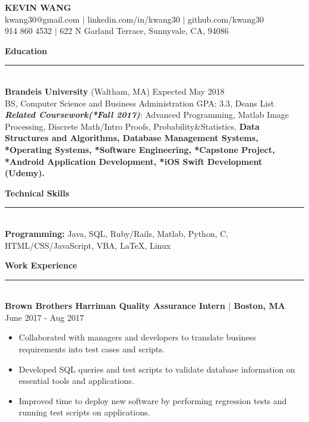 \documentclass{article}
\newcommand{\HRule}{\rule{\linewidth}{0.4mm}}
\begin{document}



\begin{center}
\textbf{{\LARGE {\Huge {KEVIN WANG}}}} \\ 
{\fontsize{11}{13.2} kwang30@gmail.com  $|$ linkedin.com/in/kwang30 $|$ github.com/kwang30 \\
914 860 4532 $|$ 622 N Garland Terrace, Sunnyvale, CA, 94086}\\[1ex]
\end{center}
\vspace{-2mm}
\normalsize

\noindent
\textbf{{\Large Education}}\\[-2mm]
\HRule\\
\textbf{Brandeis University} (Waltham, MA)
\hfill Expected May 2018 \\
\indent
BS, Computer Science and Business Administration
\hfill{GPA: 3.3, Deans List}\\
\textit{\textbf{Related Coursework(*Fall 2017)}}: Advanced Programming, Matlab Image Processing, Discrete Math/Intro Proofs, Probability\&Statistics, {\textbf{Data Structures and Algorithms, Database Management Systems, *Operating Systems, *Software Engineering, *Capstone Project, *Android Application Development, *iOS Swift Development (Udemy).}}
\vspace{2mm}


\noindent
\textbf{{\Large Technical Skills}}\\[-2mm]
\HRule\\
\textbf{Programming:} Java, SQL, Ruby/Rails, Matlab, Python, C, HTML/CSS/JavaScript, VBA, \LaTeX, Linux \vspace{2mm}

\noindent
\textbf{{\Large Work Experience}}\\[-2mm]
\HRule\\
\noindent
\textbf{Brown Brothers Harriman Quality Assurance Intern $|$ Boston, MA}
\hfill June 2017 - Aug 2017

\begin{itemize}[leftmargin=*]
\vspace{-2.5mm}
\item Collaborated with managers and developers to translate business requirements into test cases and scripts.
\vspace{-2.5mm}
\item Developed SQL queries and test scripts to validate database information on essential tools and applications.
\vspace{-2.5mm}
\item Improved time to deploy new software by performing regression tests and running test scripts on applications.
\end{itemize}
\vspace{-2.0mm}
\end{document}
